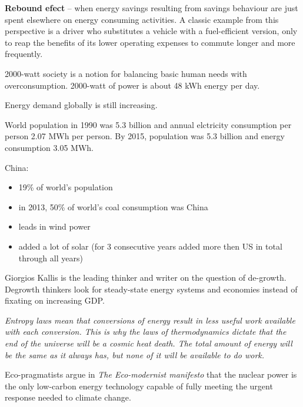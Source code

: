 \textbf{Rebound efect} -- when energy savings resulting from savings behaviour
are just spent elsewhere on energy consuming activities. A classic example
from this perspective is a driver who substitutes a vehicle with a
fuel-efficient version, only to reap the benefits of its lower operating
expenses to commute longer and more frequently.

2000-watt society is a notion for balancing basic human needs with
overconsumption. 2000-watt of power is about 48 kWh energy per day.

Energy demand globally is still increasing.

World population in 1990 was 5.3 billion and annual elctricity consumption
per person 2.07 MWh per person. By 2015, population was 5.3 billion and energy
consumption 3.05 MWh.

China:
\begin{itemize}
	\item 19\% of world's population
	\item in 2013, 50\% of world's coal consumption was China
	\item leads in wind power
	\item added a lot of solar (for 3 consecutive years added more then US
	in total through all years)
\end{itemize}

Giorgios Kallis is the leading thinker and writer on the question of de-growth.
Degrowth thinkers look for steady-state energy systems and economies instead
of fixating on increasing GDP.

\textit{
Entropy laws mean that conversions of energy result in less useful work
available with each conversion. This is why the laws of thermodynamics dictate
that the end of the universe will be a cosmic heat death. The total amount of
energy will be the same as it always has, but none of it will be available to
do work.
}

Eco-pragmatists argue in \textit{The Eco-modernist manifesto} that the nuclear
power is the only low-carbon energy technology capable of fully meeting the
urgent response needed to climate change.
